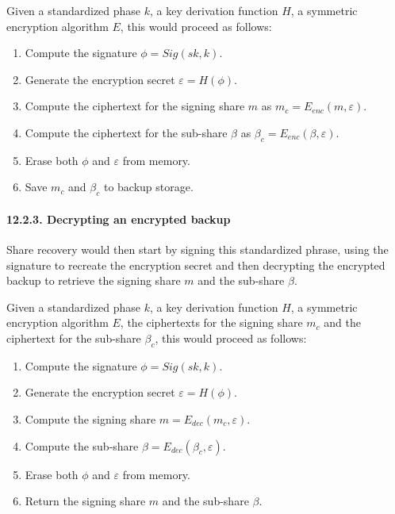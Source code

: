 \documentclass[
]{article}
\providecommand{\tightlist}{%
  \setlength{\itemsep}{0pt}\setlength{\parskip}{0pt}}
\begin{document}
Given a standardized phase \(k\), a key derivation function \(H\), a
symmetric encryption algorithm \(E\), this would proceed as follows:

\begin{enumerate}
\def\labelenumi{\arabic{enumi}.}
\tightlist
\item
  Compute the signature \(\phi = Sig(sk, k)\).
\item
  Generate the encryption secret \(\varepsilon = H(\phi)\).
\item
  Compute the ciphertext for the signing share \(m\) as
  \(m_c = E_{enc}(m, \varepsilon)\).
\item
  Compute the ciphertext for the sub-share \(\beta\) as
  \(\beta _c = E_{enc}(\beta, \varepsilon)\).
\item
  Erase both \(\phi\) and \(\varepsilon\) from memory.
\item
  Save \(m_c\) and \(\beta _c\) to backup storage.
\end{enumerate}

\hypertarget{share-recovery-backup-decrypted}{%
\paragraph{12.2.3. Decrypting an encrypted
backup}\label{share-recovery-backup-decrypted}}

Share recovery would then start by signing this standardized phrase,
using the signature to recreate the encryption secret and then
decrypting the encrypted backup to retrieve the signing share \(m\) and
the sub-share \(\beta\).

Given a standardized phase \(k\), a key derivation function \(H\), a
symmetric encryption algorithm \(E\), the ciphertexts for the signing
share \(m_c\) and the ciphertext for the sub-share \(\beta _c\), this
would proceed as follows:

\begin{enumerate}
\def\labelenumi{\arabic{enumi}.}
\tightlist
\item
  Compute the signature \(\phi = Sig(sk, k)\).
\item
  Generate the encryption secret \(\varepsilon = H(\phi)\).
\item
  Compute the signing share \(m = E_{dec}(m_c, \varepsilon)\).
\item
  Compute the sub-share \(\beta = E_{dec}(\beta _c, \varepsilon)\).
\item
  Erase both \(\phi\) and \(\varepsilon\) from memory.
\item
  Return the signing share \(m\) and the sub-share \(\beta\).
\end{enumerate}
\end{document}

